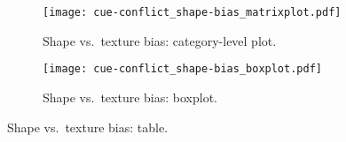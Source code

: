 \begin{figure}[h]
	\texttt{[image: cue-conflict\_shape-bias\_matrixplot.pdf]}
	\caption{Shape vs.\ texture bias: category-level plot.}
\end{figure}\hfill


\begin{figure}[h]
	\texttt{[image: cue-conflict\_shape-bias\_boxplot.pdf]}
	\caption{Shape vs.\ texture bias: boxplot.}
\end{figure}\hfill

\begin{table}[h!]
	\caption{Shape vs.\ texture bias: table.}
	\label{tab:shapbe_bias_table}
	\centering
	
\end{table}